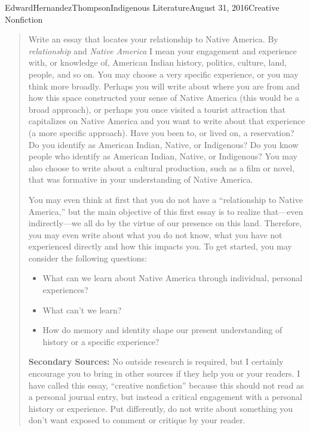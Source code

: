 \documentclass[12pt,letterpaper]{article}
\begin{document}
\begin{mla}{Edward}{Hernandez}{Thompson}{Indigenous Literature}{August 31, 2016}{Creative Nonfiction}

\begin{quote}

	Write an essay that locates your relationship to Native America.  By
	\emph{relationship} and \emph{Native America} I mean your engagement and
	experience with, or knowledge of, American Indian history, politics,
	culture, land, people, and so on. You may choose a very specific
	experience, or you may think more broadly.  Perhaps you will write about
	where you are from and how this space constructed your sense of Native
	America (this would be a broad approach), or perhaps you once visited a
	tourist attraction that capitalizes on Native America and you want to write
	about that experience (a more specific approach). Have you been to, or
	lived on, a reservation? Do you identify as American Indian, Native, or
	Indigenous? Do you know people who identify as American Indian, Native, or
	Indigenous? You may also choose to write about a cultural production, such
	as a film or novel, that was formative in your understanding of Native
	America.

	You may even think at first that you do not have a ``relationship to Native
	America,'' but the main objective of this first essay is to realize
	that---even indirectly---we all do by the virtue of our presence on this
	land. Therefore, you may even write about what you do not know, what you
	have not experienced directly and how this impacts you. To get started, you
	may consider the following questions:

	\begin{itemize}
		\item What can we learn about Native America through individual,
			personal experiences?
		\item What can't we learn?
		\item How do memory and identity shape our present understanding of
			history or a specific experience?
	\end{itemize}

	\textbf{Secondary Sources:}
	No outside research is required, but I certainly encourage you to bring in
	other sources if they help you or your readers. I have called this essay,
	``creative nonfiction'' because this should not read as a personal journal
	entry, but instead a critical engagement with a personal history or
	experience. Put differently, do not write about something you don't want
	exposed to comment or critique by your reader.


\end{quote}
\end{mla}
\end{document}
